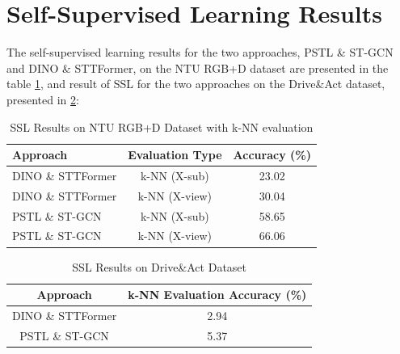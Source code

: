 \section{Self-Supervised Learning Results}
The self-supervised learning results for the two approaches, PSTL \& ST-GCN and DINO \& STTFormer, on the NTU RGB+D dataset are presented in the table \ref{tab:ssl_knn_ntu}, and result of SSL for the two approaches on the Drive\&Act dataset, presented in \ref{tab:ssl_knn_daa}:

\begin{table}[h]
\centering
\caption{SSL Results on NTU RGB+D Dataset with k-NN evaluation}
\label{tab:ssl_knn_ntu}
\begin{tabular}{|l|c|c|}
\hline
Approach & Evaluation Type & Accuracy (\%) \\
\hline
DINO \& STTFormer & k-NN (X-sub) & 23.02 \\
DINO \& STTFormer & k-NN (X-view) & 30.04 \\
\hline
PSTL \& ST-GCN & k-NN (X-sub) & 58.65 \\
PSTL \& ST-GCN & k-NN (X-view) & 66.06 \\
\hline
\end{tabular}
\end{table}


\begin{table}[h]
\centering
\caption{SSL Results on Drive\&Act Dataset}
\label{tab:ssl_knn_daa}
\begin{tabular}{|c|c|}
\hline
Approach & k-NN Evaluation Accuracy (\%) \\
\hline
DINO \& STTFormer & 2.94 \\
PSTL \& ST-GCN & 5.37 \\
\hline
\end{tabular}
\end{table}


